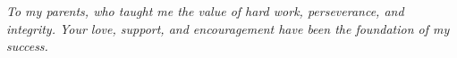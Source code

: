 \begin{center}
\textit{To my parents, who taught me the value of hard work, perseverance, and integrity. Your love, support, and encouragement have been the foundation of my success.}
\end{center}